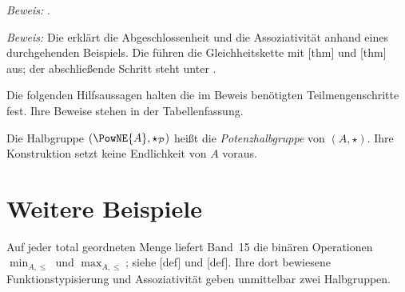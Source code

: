 \documentclass[main.tex]{subfiles}
\begin{document}
\noindent\emph{Beweis:} .



\noindent\emph{Beweis:} Die \PowerReadingLink{} erklärt die
Abgeschlossenheit und die Assoziativität anhand eines durchgehenden Beispiels.
Die \PowerProofsLink{} führen die Gleichheitskette mit
[thm] und
[thm] aus;
der abschließende Schritt steht unter .

Die folgenden Hilfsaussagen halten die im Beweis benötigten Teilmengenschritte
fest. Ihre Beweise stehen in der Tabellenfassung.
\begingroup
\setcounter{proofpartnr}{0}
\ProofPartSetParent{\theformulaThm}
\hypertarget{proofpartnr.28.2.4.2.4}{}
\hypertarget{formulaThm.2.4.3}{}
\hypertarget{formulaThm.2.4.4}{}
\endgroup


Die Halbgruppe \((\PowNE{A},\star_{\mathcal P})\) heißt die
\emph{Potenzhalbgruppe} von \((A,\star)\). Ihre Konstruktion setzt keine
Endlichkeit von \(A\) voraus.


\section{Weitere Beispiele}

Auf jeder total geordneten Menge liefert Band~15 die binären Operationen
\(\min_{A,\leq}\) und \(\max_{A,\leq}\); siehe
[def] und
[def]. Ihre dort bewiesene
Funktionstypisierung und Assoziativität geben unmittelbar zwei Halbgruppen.
\end{document}
